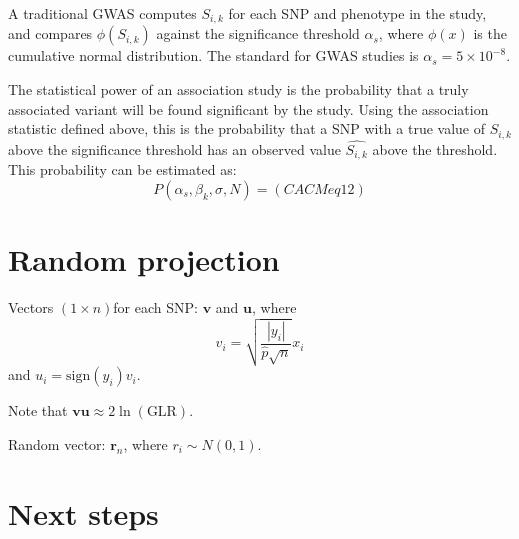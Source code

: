 \documentclass{article}
\newcommand{\mb}[1]{\mathbf{#1}}
\begin{document}
A traditional GWAS computes $S_{i,k}$ for each SNP and phenotype in the study, and compares $\phi(S_{i,k})$ against the significance threshold $\alpha_s$, where $\phi(x)$ is the cumulative normal distribution. The standard for GWAS studies is $\alpha_s = 5 \times 10^{-8}$.

The statistical power of an association study is the probability that a truly associated variant will be found significant by the study. Using the association statistic defined above, this is the probability that a SNP with a true value of $S_{i,k}$ above the significance threshold has an observed value $\hat{S_{i,k}}$ above the threshold. This probability can be estimated as:
\[P(\alpha_s, \beta_k, \sigma, N) = (CACM eq 12)\]


\section{Random projection}
Vectors $(1 \times n) $for each SNP: $\mb{v}$ and $\mb{u}$, where
\[v_i = \sqrt{\frac{|y_i|}{\hat{p} \sqrt{n}}}x_i\]
and $u_i = \text{sign}(y_i)v_i$.
	
Note that $\mb{vu} \approx 2\ln(\text{GLR})$.
	
Random vector: $\mb{r}_{n}$, where $r_i \sim N(0,1)$. 
	
\section{Next steps}
\end{document}
